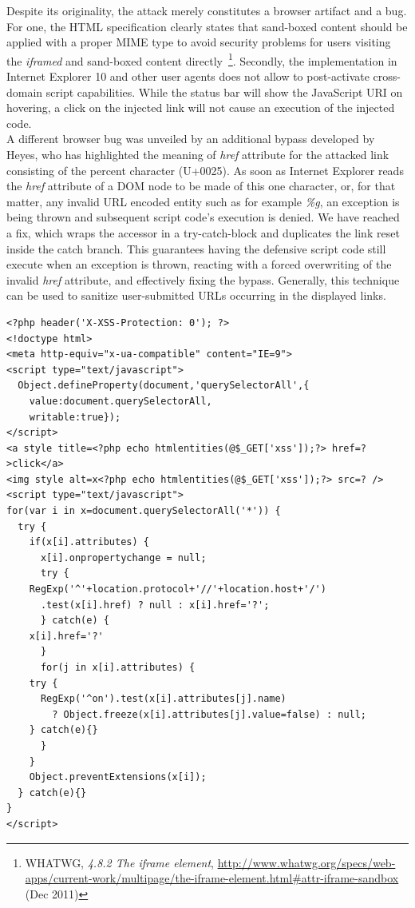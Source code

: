       Despite its originality, the attack merely constitutes a browser artifact and a bug. For one, the HTML specification clearly states that sand-boxed content should be applied with a proper MIME type to avoid security problems for users visiting the \textit{iframed} and sand-boxed content directly~\footnote{WHATWG, \textit{4.8.2 The iframe element}, \url{http://www.whatwg.org/specs/web-apps/current-work/multipage/the-iframe-element.html#attr-iframe-sandbox} (Dec 2011)}. Secondly, the implementation in Internet Explorer 10 and other user agents does not allow to post-activate cross-domain script capabilities. While the status bar will show the JavaScript URI on hovering, a click on the injected link will not cause an execution of the injected code. \\

      A different browser bug was unveiled by an additional bypass developed by Heyes, who has highlighted the meaning of \textit{href} attribute for the attacked link consisting of the percent character (U+0025). As soon as Internet Explorer reads the \textit{href} attribute of a DOM node to be made of this one character, or, for that matter, any invalid URL encoded entity such as for example \textit{\%g}, an exception is being thrown and subsequent script code's execution is denied. We have reached a fix, which wraps the accessor in a try-catch-block and duplicates the link reset inside the catch branch. This guarantees having the defensive script code still execute when an exception is thrown, reacting with a forced overwriting of the invalid \textit{href} attribute, and effectively fixing the bypass. Generally, this technique can be used to sanitize user-submitted URLs occurring in the displayed links.\\

\begin{lstlisting}[captionpos=b,label=lst:challenge-testbed,caption=Source-code for the event control breaker challenge]
<?php header('X-XSS-Protection: 0'); ?>
<!doctype html>
<meta http-equiv="x-ua-compatible" content="IE=9">
<script type="text/javascript">
  Object.defineProperty(document,'querySelectorAll',{
    value:document.querySelectorAll,
    writable:true});
</script>
<a style title=<?php echo htmlentities(@$_GET['xss']);?> href=?>click</a>
<img style alt=x<?php echo htmlentities(@$_GET['xss']);?> src=? />
<script type="text/javascript">
for(var i in x=document.querySelectorAll('*')) {
  try {
    if(x[i].attributes) {
      x[i].onpropertychange = null;
      try {
	RegExp('^'+location.protocol+'//'+location.host+'/')
	  .test(x[i].href) ? null : x[i].href='?';
      } catch(e) {
	x[i].href='?'
      }
      for(j in x[i].attributes) {
	try {
	  RegExp('^on').test(x[i].attributes[j].name) 
	    ? Object.freeze(x[i].attributes[j].value=false) : null;
	} catch(e){}
      }
    }
    Object.preventExtensions(x[i]);
  } catch(e){}
}
</script>
\end{lstlisting}

